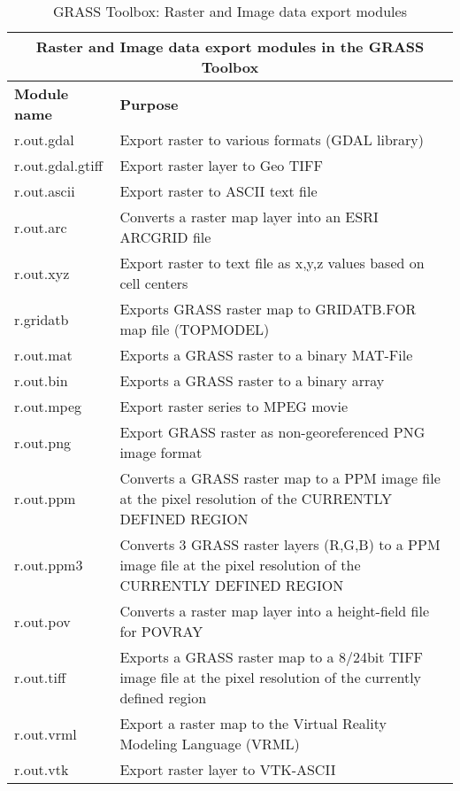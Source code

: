 \newpage

\begin{table}[ht]
\centering
\caption{GRASS Toolbox: Raster and Image data export modules}\medskip
 \begin{tabular}{|p{4cm}|p{12cm}|}
  \hline \multicolumn{2}{|c|}{\textbf{Raster and Image data export modules in
the GRASS
  Toolbox}} \\
  \hline \textbf{Module name} & \textbf{Purpose} \\
  \hline r.out.gdal & Export raster to various formats (GDAL library) \\
  \hline r.out.gdal.gtiff & Export raster layer to Geo TIFF \\
  \hline r.out.ascii & Export raster to ASCII text file \\
  \hline r.out.arc & Converts a raster map layer into an ESRI ARCGRID file \\
  \hline r.out.xyz & Export raster to text file as x,y,z values based on cell centers \\
  \hline r.gridatb & Exports GRASS raster map to GRIDATB.FOR map file
  (TOPMODEL) \\
  \hline r.out.mat & Exports a GRASS raster to a binary MAT-File \\
  \hline r.out.bin & Exports a GRASS raster to a binary array \\
  \hline r.out.mpeg & Export raster series to MPEG movie \\
  \hline r.out.png & Export GRASS raster as non-georeferenced PNG image
  format \\
  \hline r.out.ppm & Converts a GRASS raster map to a PPM image file at the
  pixel resolution of the CURRENTLY DEFINED REGION \\
  \hline r.out.ppm3 & Converts 3 GRASS raster layers (R,G,B) to a PPM image
  file at the pixel resolution of the CURRENTLY DEFINED REGION \\
  \hline r.out.pov & Converts a raster map layer into a height-field file for
  POVRAY\\
  \hline r.out.tiff & Exports a GRASS raster map to a 8/24bit TIFF image file
  at the pixel resolution of the currently defined region\\
  \hline r.out.vrml &  Export a raster map to the Virtual Reality Modeling
  Language (VRML)\\
  \hline r.out.vtk & Export raster layer to VTK-ASCII \\
\hline
\end{tabular}
\end{table}

